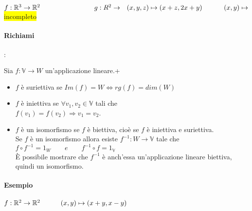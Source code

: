 \documentclass{article}
\newcommand{\hl}[1]{\colorbox{yellow}{#1}}
\newcommand{\R}{\mathbb{R}}
\newcommand{\V}{\mathbb{V}}
\begin{document}
$f:\R^3\rightarrow\R^2\hspace{8em} g:R^2\rightarrow\\\hspace*{0.7em}(x,y,z)\mapsto(x+z,2x+y)\hspace*{3.2em}(x,y)\mapsto$ \hl{incompleto}

	\paragraph{Richiami}:

	Sia $f:\V\rightarrow W$ un'applicazione lineare.+
	\begin{itemize}
		\item $f$ è suriettiva se $Im(f)=W\Leftrightarrow rg(f)=dim(W)$
		\item $f$ è iniettiva se $\forall v_1,v_2\in\V$ tali che\\
		      $f(v_1)=f(v_2)\Rightarrow v_1=v_2$.
		\item $f$ è un isomorfismo se $f$ è biettiva, cioè se $f$ è iniettiva e suriettiva.\\
		      Se $f$ è un isomorfismo allora esiste $f^{-1}:W\rightarrow\V$ tale che\\
		      $f\circ f^{-1}=1_W\qquad e\qquad f^{-1}\circ f=1_\V$\\
		      È possibile mostrare che $f^{-1}$ è anch'essa un'applicazione lineare biettiva, quindi un isomorfismo.
	\end{itemize}

	\paragraph*{Esempio}

$f:\R^2\rightarrow\R^2\\\hspace*{3em}(x,y)\mapsto(x+y,x-y)$
\end{document}
